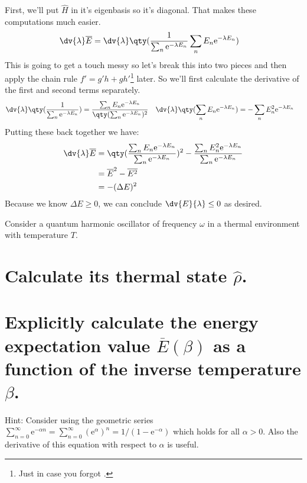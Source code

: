 \documentclass[boxes,pages]{homework}
\makeatletter
\newcommand{\e}{\mathrm{e}}
\numberwithin{@problem}{section}
\makeatother
\begin{document}
\begin{solution}
	First, we'll put $\hat{H}$ in it's eigenbasis so it's diagonal. That makes these computations much easier.
	\begin{align*}
		\dv{\lambda}\overline{E} & = \dv{\lambda}\qty(\frac{1}{\sum_n\e^{-\lambda E_n}}\sum_n E_n\e^{-\lambda E_n})
	\end{align*}
	This is going to get a touch messy so let's break this into two pieces and then apply the chain rule $f' = g'h + gh'$\footnote{Just in case you forgot \Winkey.} later. So we'll first calculate the derivative of the first and second terms separately.
	\begin{align*}
		\dv{\lambda}\qty(\frac{1}{\sum_n\e^{-\lambda E_n}}) & = \frac{\sum_n E_n\e^{-\lambda E_n}}{\qty(\sum_n\e^{-\lambda E_n})^2} & \dv{\lambda}\qty(\sum_n E_n\e^{-\lambda E_n}) & = -\sum_n E_n^2\e^{-\lambda E_n}
	\end{align*}
	Putting these back together we have:
	\begin{align*}
		\dv{\lambda}\overline{E} & =\qty(\frac{\sum_n E_n\e^{-\lambda E_n}}{\sum_n\e^{-\lambda E_n}})^2 - \frac{\sum_n E_n^2\e^{-\lambda E_n}}{\sum_n\e^{-\lambda E_n}} \\
		                         & = \overline{E}^2 - \overline{E^2}                                                                                                    \\
		                         & = -(\Delta E)^2
	\end{align*}
	Because we know $\Delta E \geq 0$, we can conclude $\dv{E}{\lambda} \leq 0$ as desired.
\end{solution}

\begin{problem}
Consider a quantum harmonic oscillator of frequency $\omega$ in a thermal environment with temperature $T$.
\begin{parts}
	\part{Calculate its thermal state $\hat{\rho}$.}\label{part:3a}
	\part{Explicitly calculate the energy expectation value $\overline{E}(\beta)$ as a function of the inverse temperature $\beta$.}\label{part:3b}
\end{parts}
Hint: Consider using the geometric series $\sum_{n=0}^\infty\e^{-\alpha n} = \sum_{n=0}^\infty(\e^\alpha)^n = 1 / (1 - \e^{-\alpha})$ which holds for all $\alpha > 0$. Also the derivative of this equation with respect to $\alpha$ is useful.
\end{problem}
\end{document}
